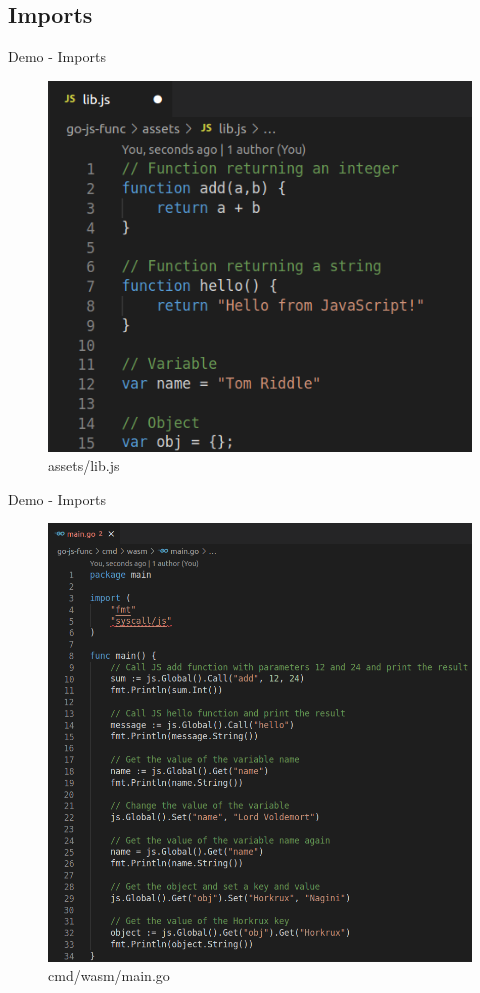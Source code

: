 \documentclass{beamer}
\begin{document}
\subsection{Imports}

\begin{frame}{Demo - Imports}
\begin{figure}
        \includegraphics[scale=0.4]{./images/libjsfunc.png}
        \caption{assets/lib.js}
    \end{figure}
\end{frame}

\begin{frame}{Demo - Imports}
 \begin{figure}
        \includegraphics[scale=0.2]{./images/jsfuncmain.png}
        \caption{cmd/wasm/main.go}
    \end{figure}
\end{frame}
\end{document}
